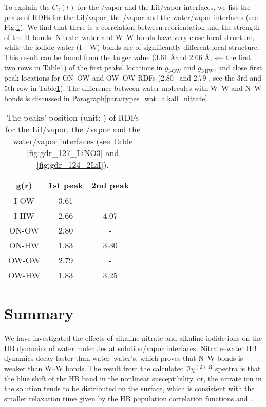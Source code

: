 To explain the $C_2(t)$ for the \LiN/vapor and the LiI/vapor interfaces, 
we list the peaks of RDFs for the LiI/vapor, the \LiN/vapor and the water/vapor interfaces (see Fig.\thinspace\ref{tab:rdf_I2wat_peaks}).
We find that there is a correlation between reorientation and the strength of the H-bonds:
Nitrate--water and W--W bonds have very close local structure, while the iodide-water (I$^-$--W) bonds are of significantly different local structure.
This result can be found from the larger value (3.61 \AA and 2.66 \AA, 
see the first two rows in Table\thinspace\ref{tab:rdf_I2wat_peaks}) of the first peaks' locations in $g_\text{I-OW}$ and $g_\text{I-HW}$,
and close first peak locations for ON--OW and OW--OW RDFs (2.80 \A\  and 2.79 \A, see the 3rd and 5th row in Table\thinspace\ref{tab:rdf_I2wat_peaks}). 
The difference between water molecules with W--W and N--W bonds is discussed in Paragraph\thinspace\ref{para:types_wat_alkali_nitrate}.
\begin{table}[H]
\centering
\caption{\label{tab:rdf_I2wat_peaks} 
The peaks' position (unit: \A) of RDFs for the LiI/vapor, the \LiN/vapor and the water/vapor interfaces (see Table \ref{fig:gdr_127_LiNO3} and \ref{fig:gdr_124_2LiI}). 
}
\begin{tabular}{cccc}
 g(r) & 1st peak & 2nd peak \\
\hline
 I-OW & 3.61 & - \\
 I-HW & 2.66 & 4.07 \\
 ON-OW & 2.80 & -\\
 ON-HW & 1.83 & 3.30 \\
 OW-OW & 2.79 & - \\
 OW-HW & 1.83 & 3.25 \\
\end{tabular}
\end{table} 

\section{Summary}
We have investigated the effects of alkaline nitrate and alkaline iodide ions on the HB dynamics
of water molecules at solution/vapor interfaces.
Nitrate--water HB dynamics decay faster than water--water's, 
which proves that N--W bonds is weaker than W--W bonds. 
The result from the calculated $\Im\chi^{(2),\text{R}}$ spectra is that the blue shift of the HB band in the nonlinear susceptibility, 
or, the nitrate ion in the solution tends to be distributed on the surface, 
which is consistent with the smaller relaxation time given by the HB population correlation functions \CHB and \SHB.

